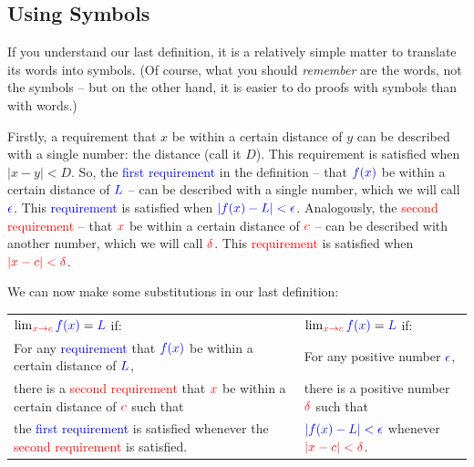 \documentclass{myarticle}
\newcommand{\hor}[1]{\textcolor{red}{#1}}
\newcommand{\ver}[1]{\textcolor{blue}{#1}}
\theoremstyle{nospace}
\newtheorem{old series theorem}{Theorem}
\newenvironment{series theorem}
{\begin{mdframed}\begin{old series theorem}}
    {\end{old series theorem}\end{mdframed}}
\begin{document}
\subsection{Using Symbols}
\label{sec:using symbols}

If you understand our last definition, it is a relatively simple
matter to translate its words into symbols. (Of course, what you
should \emph{remember} are the words, not the symbols -- but on the
other hand, it is easier to do proofs with symbols than with words.)

Firstly, a requirement that $x$ be within a certain distance of $y$
can be described with a single number: the distance (call it $D$).
This requirement is satisfied when $|x - y| < D$. So, the \ver{first
  requirement} in the definition -- that $\ver{f(x)}$ be within a
certain distance of $\ver{L}$ -- can be described with a single
number, which we will call $\ver{\epsilon}$. This \ver{requirement} is
satisfied when $\ver{|f(x) - L| < \epsilon}$. Analogously, the
\hor{second requirement} -- that $\hor{x}$ be within a certain
distance of $\hor{c}$ -- can be described with another number, which
we will call $\hor{\delta}$. This \hor{requirement} is satisfied when
$\hor{|x - c| < \delta}$.

We can now make some substitutions in our last definition:

\begin{mdframed}
  \setlength{\LTpre}{0pt}
  \setlength{\LTpost}{0pt}
  \begin{longtable}{P{0.47\textwidth}|P{0.47\textwidth}}

    $\lim_{\hor{x \to c}} \ver{f(x)} = \ver{L}$ if: &
    $\lim_{\hor{x \to c}} \ver{f(x)} = \ver{L}$ if: \\

    For any \ver{requirement} that $\ver{f(x)}$ be within a certain
    distance of $\ver{L}$, &
    For any positive number $\ver{\epsilon}$, \\

    there is a \hor{second requirement} that $\hor{x}$ be within a
    certain distance of $\hor{c}$ such that &
    there is a positive number $\hor{\delta}$ such that \\

    the \ver{first requirement} is satisfied whenever the \hor{second
      requirement} is satisfied. &
    $\ver{|f(x) - L| < \epsilon}$ whenever $\hor{|x - c| < \delta}$.
    \\

  \end{longtable}
\end{mdframed}
\end{document}
